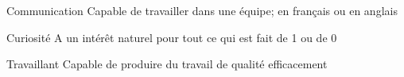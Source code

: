 

\begin{cvskills}

  \cvskill
    {Communication} %
    {Capable de travailler dans une équipe; en français ou en anglais}
    
  \cvskill
    {Curiosité} %
    {A un intérêt naturel pour tout ce qui est fait de 1 ou de 0}
    
  \cvskill
    {Travaillant} %
    {Capable de produire du travail de qualité efficacement}

\end{cvskills}
